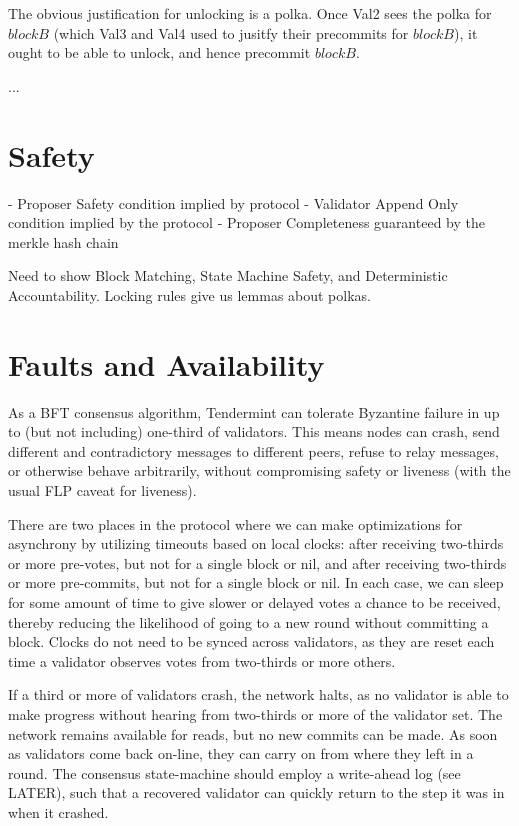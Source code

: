 The obvious justification for unlocking is a polka. Once Val2 sees the polka for $blockB$ (which Val3 and Val4 used to jusitfy their precommits for $blockB$), 
it ought to be able to unlock, and hence precommit $blockB$.

...

\section{Safety}

- Proposer Safety condition implied by protocol
- Validator Append Only condition implied by the protocol
- Proposer Completeness guaranteed by the merkle hash chain

Need to show Block Matching, State Machine Safety, and Deterministic Accountability.
Locking rules give us lemmas about polkas.





\section{Faults and Availability}

As a BFT consensus algorithm, Tendermint can tolerate Byzantine failure in up to (but not including) one-third of validators.
This means nodes can crash, send different and contradictory messages to different peers, refuse to relay messages, or otherwise behave arbitrarily,
without compromising safety or liveness (with the usual FLP caveat for liveness).

There are two places in the protocol where we can make optimizations for asynchrony by utilizing timeouts based on local clocks:
after receiving two-thirds or more pre-votes, but not for a single block or nil, and after receiving two-thirds or more pre-commits, 
but not for a single block or nil.
In each case, we can sleep for some amount of time to give slower or delayed votes a chance to be received,
thereby reducing the likelihood of going to a new round without committing a block.
Clocks do not need to be synced across validators, as they are reset each time a validator observes votes from two-thirds or more others.

If a third or more of validators crash, the network halts, 
as no validator is able to make progress without hearing from two-thirds or more of the validator set.
The network remains available for reads, but no new commits can be made.
As soon as validators come back on-line, they can carry on from where they left in a round. 
The consensus state-machine should employ a write-ahead log (see LATER),
such that a recovered validator can quickly return to the step it was in when it crashed.

